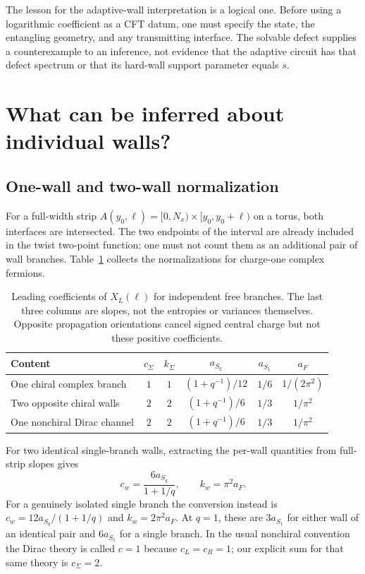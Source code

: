 \documentclass[aps,prb,onecolumn,nofootinbib,superscriptaddress]{revtex4-2}
\begin{document}
The lesson for the adaptive-wall interpretation is a logical one.
Before using a logarithmic coefficient as a CFT datum, one must specify
the state, the entangling geometry, and any transmitting interface.
The solvable defect supplies a counterexample to an inference, not
evidence that the adaptive circuit has that defect spectrum or that its
hard-wall support parameter equals $s$.

\section{What can be inferred about individual walls?}
\label{sec:walls}
\subsection{One-wall and two-wall normalization}
For a full-width strip
$A(y_0,\ell)=[0,N_x)\times[y_0,y_0+\ell)$ on a torus, both interfaces
are intersected. The two endpoints of the interval are already included
in the twist two-point function; one must not count them as an additional
pair of wall branches. Table~\ref{tab:normalization} collects the
normalizations for charge-one complex fermions.

\begin{table}[tb]
\caption{Leading coefficients of $X_L(\ell)$ for independent free branches.
The last three columns are slopes, not the entropies or variances themselves.
Opposite propagation orientations cancel signed central charge but not
these positive coefficients.}
\label{tab:normalization}
\centering
\begin{ruledtabular}
\begin{tabular}{lccccc}
Content & $c_\Sigma$ & $k_\Sigma$ & $a_{S_q}$ & $a_{S_1}$ & $a_F$\\
\hline
One chiral complex branch & $1$ & $1$ & $(1+q^{-1})/12$ & $1/6$ & $1/(2\pi^2)$\\
Two opposite chiral walls & $2$ & $2$ & $(1+q^{-1})/6$ & $1/3$ & $1/\pi^2$\\
One nonchiral Dirac channel & $2$ & $2$ & $(1+q^{-1})/6$ & $1/3$ & $1/\pi^2$
\end{tabular}
\end{ruledtabular}
\end{table}

For two identical single-branch walls, extracting the per-wall quantities
from full-strip slopes gives
\begin{equation}
 c_w=\frac{6a_{S_q}}{1+1/q},\qquad k_w=\pi^2a_F .
 \label{eq:two-wall-estimators}
\end{equation}
For a genuinely isolated single branch the conversion instead is
$c_w=12a_{S_q}/(1+1/q)$ and $k_w=2\pi^2a_F$.
At $q=1$, these are $3a_{S_1}$ for either wall of an identical pair and
$6a_{S_1}$ for a single branch. In the usual nonchiral convention the
Dirac theory is called $c=1$ because $c_L=c_R=1$; our explicit sum for that
same theory is $c_\Sigma=2$.
\end{document}

